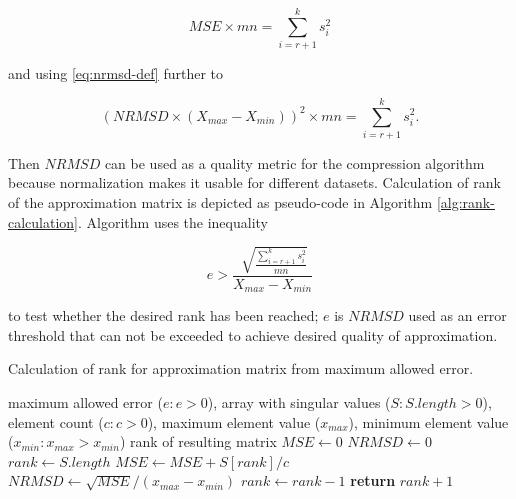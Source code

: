 \begin{equation}
\mathit{MSE} \times m n = \sum_{i=r+1}^{k} s_{i}^{2}
\end{equation}

\noindent
and using \eqref{eq:nrmsd-def} further to

\begin{equation}
(\mathit{NRMSD} \times (X_{max}-X_{min}))^{2} \times m n = \sum_{i=r+1}^{k} s_{i}^{2}.
\end{equation}

Then $\mathit{NRMSD}$ can be used as a quality metric for the compression algorithm because normalization makes it usable for different datasets. Calculation of rank of the approximation matrix is depicted as pseudo-code in Algorithm \ref{alg:rank-calculation}. Algorithm uses the inequality

\begin{equation}
e > \frac{\sqrt[]{\frac{\sum_{i=r+1}^{k} s_{i}^{2}}{m n}}}{X_{max}-X_{min}}
\end{equation}

\noindent
to test whether the desired rank has been reached; $e$ is $\mathit{NRMSD}$ used as an error threshold that can not be exceeded to achieve desired quality of approximation.

\begin{algorithm}
  \caption{Calculation of rank for approximation matrix from maximum allowed error.}\label{rankAlgorithm}
  \label{alg:rank-calculation}
  \begin{algorithmic}[1]
  	\INPUT maximum allowed error ($e: e > 0$), array with singular values ($S: S.length > 0$), element count ($c: c > 0$), maximum element value ($x_{max}$), minimum element value ($x_{min}: x_{max} > x_{min}$)
    \OUTPUT rank of resulting matrix
      \State $\mathit{MSE} \gets 0$
      \State $\mathit{NRMSD} \gets 0$
      \State $rank \gets S.length$
        \State $\mathit{MSE} \gets \mathit{MSE} + S[rank]/c$ 
        \State $\mathit{NRMSD} \gets \sqrt{\mathit{MSE}} / (x_{max} - x_{min})$ 
        \State $rank \gets rank - 1$ 
      \EndWhile
      \State \textbf{return} $rank + 1$ 
    \EndProcedure
  \end{algorithmic}
\end{algorithm}

